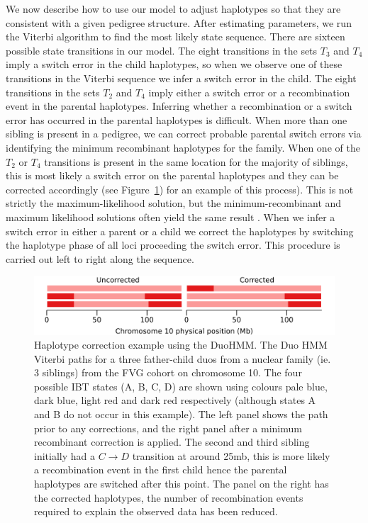 We now describe how to use our model to adjust haplotypes so that they are consistent with a given pedigree structure. After estimating parameters, we run the Viterbi algorithm to find the most likely state sequence.  There are sixteen possible state transitions in our model. The eight transitions in the sets $T_3$ and $T_4$ imply a switch error in the child haplotypes, so when we observe one of these transitions in the Viterbi sequence we infer a switch error in the child. The eight transitions in the sets $T_2$ and $T_4$ imply either a switch error or a recombination event in the parental haplotypes. Inferring whether a recombination or a switch error has occurred in the parental haplotypes is difficult. When more than one sibling is present in a pedigree, we can correct probable parental switch errors via identifying the minimum recombinant haplotypes for the family.  When one of the $T_2$ or $T_4$ transitions is present in the same location for the majority of siblings, this is most likely a switch error on the parental haplotypes and they can be corrected accordingly (see  Figure~\ref{fig:correction_example}) for an example of this process). This is not strictly the maximum-likelihood solution, but the minimum-recombinant and maximum likelihood solutions often yield the same result \citep{williams2010rapid}. When we infer a switch error in either a parent or a child we correct the haplotypes by switching the haplotype phase of all loci proceeding the switch error. This procedure is carried out left to right along the sequence. 


\begin{figure}[h]
  \begin{center} 
   \includegraphics[width=\textwidth]{chap3figs/correction_example}%
  \end{center} 
\caption[Haplotype correction example using the DuoHMM]{Haplotype correction example using the DuoHMM. The Duo HMM Viterbi paths for a three father-child duos from a nuclear family (ie. 3 siblings) from the FVG cohort on chromosome 10. The four possible IBT states (A, B, C, D) are shown using colours pale blue, dark blue, light red and dark red respectively (although states A and B do not occur in this example).  The left panel shows the path prior to any corrections, and the right panel after a minimum recombinant correction is applied.  The second and third sibling initially had a $C \rightarrow D$ transition at around 25mb, this is more likely a recombination event in the first child hence the parental haplotypes are switched after this point.  The panel on the right has the corrected haplotypes, the number of recombination events required to explain the observed data has been reduced.\label{fig:correction_example}}
\end{figure}

